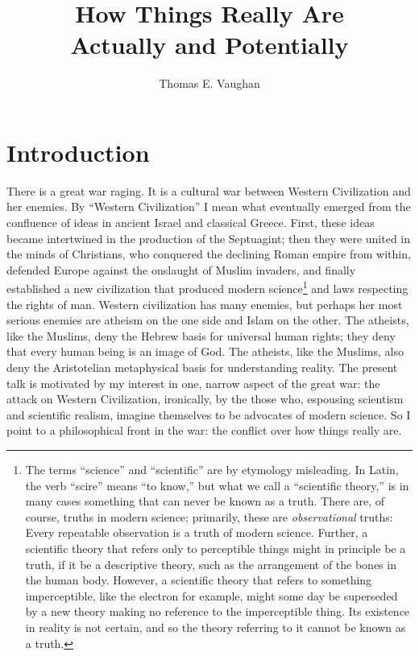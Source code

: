 \documentclass{article}
\title{How Things Really Are\\{\Large Actually and Potentially}}
\author{Thomas E. Vaughan}
\begin{document}
\maketitle

\section{Introduction}

There is a great war raging.  It is a cultural war between Western Civilization
and her enemies.  By ``Western Civilization'' I mean what eventually emerged
from the confluence of ideas in ancient Israel and classical Greece.  First,
these ideas became intertwined in the production of the Septuagint; then they
were united in the minds of Christians, who conquered the declining Roman
empire from within, defended Europe against the onslaught of Muslim invaders,
and finally established a new civilization that produced modern
science\footnote{%
   The terms ``science'' and ``scientific'' are by etymology misleading.  In
   Latin, the verb ``scire'' means ``to know,'' but what we call a ``scientific
   theory,'' is in many cases something that can never be known as a truth.
   There are, of course, truths in modern science; primarily, these are
   \emph{observational} truths: Every repeatable observation is a truth of
   modern science.  Further, a scientific theory that refers only to
   perceptible things might in principle be a truth, if it be a descriptive
   theory, such as the arrangement of the bones in the human body.  However, a
   scientific theory that refers to something imperceptible, like the electron
   for example, might some day be superseded by a new theory making no
   reference to the imperceptible thing.  Its existence in reality is not
   certain, and so the theory referring to it cannot be known as a truth.%
}
and laws respecting the rights of man.  Western civilization has many enemies,
but perhaps her most serious enemies are atheism on the one side and Islam on
the other.  The atheists, like the Muslims, deny the Hebrew basis for universal
human rights; they deny that every human being is an image of God.  The
atheists, like the Muslims, also deny the Aristotelian metaphysical basis for
understanding reality.  The present talk is motivated by my interest in one,
narrow aspect of the great war: the attack on Western Civilization, ironically,
by the those who, espousing scientism and scientific realism, imagine
themselves to be advocates of modern science.  So I point to a philosophical
front in the war: the conflict over how things really are.
\end{document}
